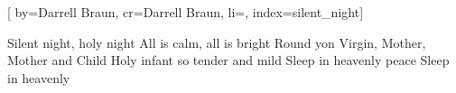 

[%
    by={Darrell Braun},
    cr={Darrell Braun},
    li={},
    index={silent_night}]


    \label{silent_night}

    \begin{center}
    \end{center}

    \beginverse\memorize[verse]
        Silent night, holy night
        All is calm, all is bright
        Round yon Virgin, Mother, Mother and Child
        Holy infant so tender and mild
        Sleep in heavenly peace
        Sleep in heavenly
    \endverse

    \beginverse\replay[verse]
    \endverse

    \beginchorus\memorize[chorus]
    \endchorus

    \beginverse*\memorize[bridge]
    \endverse
\endsong
